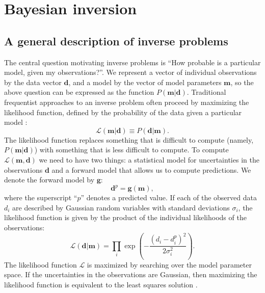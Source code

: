 \documentclass[11pt,letterpaper]{article}
\begin{document}
\section*{Bayesian inversion}
\subsection*{A general description of inverse problems}

The central question motivating inverse problems is ``How probable is a particular model, given my observations?''. We represent a vector of individual observations by the data vector $\mathbf{d}$, and a model by the vector of model parameters $\mathbf{m}$, so the above question can be expressed as the function $P(\mathbf{m} \vert \mathbf{d})$. Traditional frequentist approaches to an inverse problem often proceed by maximizing the likelihood function, defined by the probability of the data given a particular model \citep[e.g][]{Aster2005a}:
\begin{equation}
\mathcal{L} ( \mathbf{m} \vert \mathbf{d} ) \equiv P( \mathbf{d} \vert \mathbf{m} ).
\label{eq:likelihood}
\end{equation}
The likelihood function replaces something that is difficult to compute (namely, $P(\mathbf{m} \vert \mathbf{d})$)
with something that is less difficult to compute. 
To compute $\mathcal{L}(\mathbf{m}, \mathbf{d})$ we need to have two things: a statistical model for 
uncertainties in the observations $\mathbf{d}$ and a forward model that allows us to compute
predictions. We denote the forward model by $\mathbf{g}$:
\begin{equation}
\mathbf{d}^p = \mathbf{g}(\mathbf{m}),
\label{eq:forward}
\end{equation}
where the superscript ``$p$'' denotes a predicted value.
If each of the observed data $d_i$ are described by Gaussian random variables with standard deviations $\sigma_i$, the likelihood function is given by the product of the individual likelihoods of the observations:
\begin{equation}
\mathcal{L}(\mathbf{d} | \mathbf{m} ) = \displaystyle\prod_i \exp\left({-\frac{(d_i - d_{i}^p)^2}{2 \sigma_i^2}}\right).
\label{eq:example_likelihood}
\end{equation}
The likelihood function $\mathcal{L}$ is maximized by searching over the model parameter space.
If the uncertainties in the observations are Gaussian, then maximizing the likelihood function is
equivalent to the least squares solution \citep{Aster2005a}.
\end{document}
